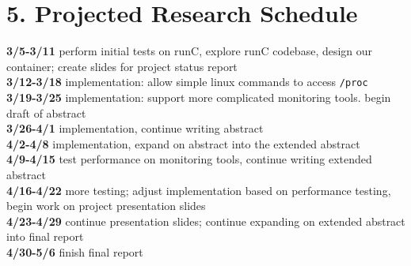\documentclass{proc}
\begin{document}
\section*{5. Projected Research Schedule}

\textbf{3/5-3/11} perform initial tests on runC, explore runC codebase, design our container; create slides for project status report\\
\textbf{3/12-3/18} implementation: allow simple linux commands to access \texttt{/proc}\\
\textbf{3/19-3/25} implementation: support more complicated monitoring tools. begin draft of abstract\\
\textbf{3/26-4/1} implementation, continue writing abstract\\
\textbf{4/2-4/8} implementation, expand on abstract into the extended abstract\\
\textbf{4/9-4/15} test performance on monitoring tools, continue writing extended abstract\\
\textbf{4/16-4/22} more testing; adjust implementation based on performance testing, begin work on project presentation slides\\
\textbf{4/23-4/29} continue presentation slides; continue expanding on extended abstract into final report\\
\textbf{4/30-5/6} finish final report



\end{document}

